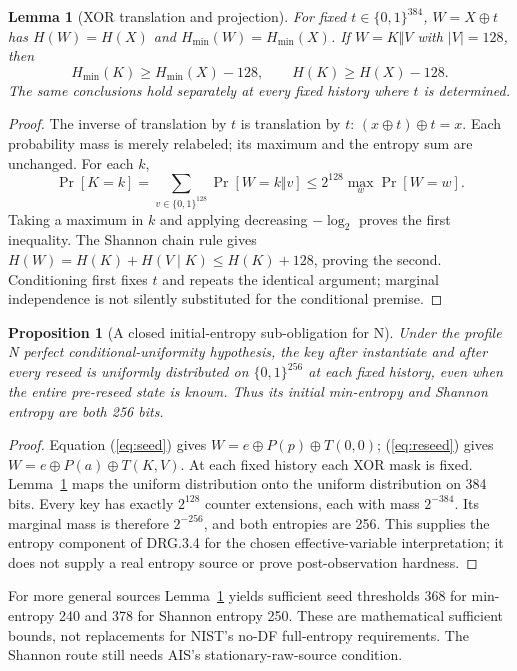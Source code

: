 \documentclass[11 pt,a 4 paper]{article}
\newtheorem{lemma}[theorem]{Lemma}
\newtheorem{proposition}[theorem]{Proposition}
\newcommand{\bits}{\{0,1\}}
\newcommand{\hm}{H_{\min}}
\begin{document}
\begin{lemma}[XOR translation and projection]\label{lem:xor}
For fixed $ t\in\bits^{384}$, $ W=X\oplus t $ has $ H(W)=H(X)$ and $\hm(W)=\hm(X)$. If $ W=K\Vert V $ with $|V|=128$, then
\begin{equation}\label{eq:projection}
 \hm(K)\geq\hm(X)-128,\qquad H(K)\geq H(X)-128.
\end{equation}
The same conclusions hold separately at every fixed history where $ t $ is determined.
\end{lemma}
\begin{proof}
The inverse of translation by $ t $ is translation by $ t $: $(x\oplus t)\oplus t=x $. Each probability mass is merely relabeled; its maximum and the entropy sum are unchanged. For each $ k $,
\[
 \Pr[K=k]=\sum_{v\in\bits^{128}}\Pr[W=k\Vert v]
 \leq 2^{128}\max_w\Pr[W=w].
\]
Taking a maximum in $ k $ and applying decreasing $-\log_2$ proves the first inequality. The Shannon chain rule gives $ H(W)=H(K)+H(V\mid K)\leq H(K)+128$, proving the second. Conditioning first fixes $ t $ and repeats the identical argument; marginal independence is not silently substituted for the conditional premise.
\end{proof}

\begin{proposition}[A closed initial-entropy sub-obligation for N]\label{prop:uniform}
Under the profile N perfect conditional-uniformity hypothesis, the key after instantiate and after every reseed is uniformly distributed on $\bits^{256}$ at each fixed history, even when the entire pre-reseed state is known. Thus its initial min-entropy and Shannon entropy are both 256 bits.
\end{proposition}
\begin{proof}
Equation (\ref{eq:seed}) gives $ W=e\oplus P(p)\oplus T(0,0)$; (\ref{eq:reseed}) gives $ W=e\oplus P(a)\oplus T(K,V)$. At each fixed history each XOR mask is fixed. Lemma~\ref{lem:xor} maps the uniform distribution onto the uniform distribution on 384 bits. Every key has exactly $2^{128}$ counter extensions, each with mass $2^{-384}$. Its marginal mass is therefore $2^{-256}$, and both entropies are 256. This supplies the entropy component of DRG.3.4 for the chosen effective-variable interpretation; it does not supply a real entropy source or prove post-observation hardness.
\end{proof}

For more general sources Lemma~\ref{lem:xor} yields sufficient seed thresholds 368 for min-entropy 240 and 378 for Shannon entropy 250. These are mathematical sufficient bounds, not replacements for NIST's no-DF full-entropy requirements. The Shannon route still needs AIS's stationary-raw-source condition.
\end{document}

